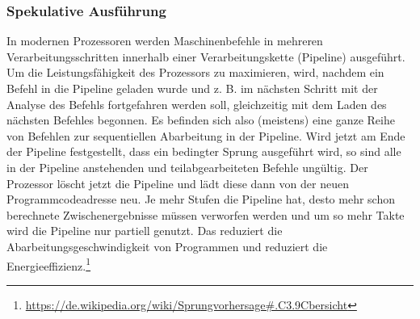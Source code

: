 \subsubsection{Spekulative Ausführung}
In modernen Prozessoren werden Maschinenbefehle in mehreren Verarbeitungsschritten innerhalb einer Verarbeitungskette (Pipeline) ausgeführt. Um die Leistungsfähigkeit des Prozessors zu maximieren, wird, nachdem ein Befehl in die Pipeline geladen wurde und z. B. im nächsten Schritt mit der Analyse des Befehls fortgefahren werden soll, gleichzeitig mit dem Laden des nächsten Befehles begonnen. Es befinden sich also (meistens) eine ganze Reihe von Befehlen zur sequentiellen Abarbeitung in der Pipeline. Wird jetzt am Ende der Pipeline festgestellt, dass ein bedingter Sprung ausgeführt wird, so sind alle in der Pipeline anstehenden und teilabgearbeiteten Befehle ungültig. Der Prozessor löscht jetzt die Pipeline und lädt diese dann von der neuen Programmcodeadresse neu. Je mehr Stufen die Pipeline hat, desto mehr schon berechnete Zwischenergebnisse müssen verworfen werden und um so mehr Takte wird die Pipeline nur partiell genutzt. Das reduziert die Abarbeitungsgeschwindigkeit von Programmen und reduziert die Energieeffizienz.\footnote{\url{https://de.wikipedia.org/wiki/Sprungvorhersage\#.C3.9Cbersicht}}

